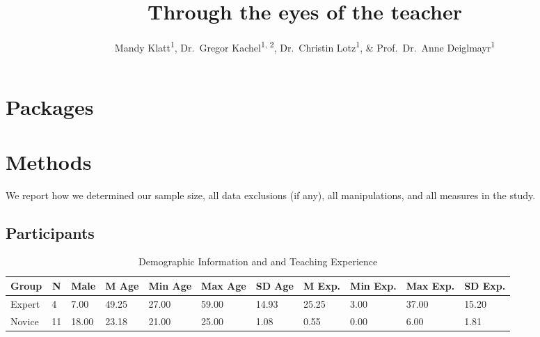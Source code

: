 \documentclass[
  english,
  man,floatsintext]{apa6}
\title{Through the eyes of the teacher}
\author{Mandy Klatt\textsuperscript{1}, Dr.~Gregor Kachel\textsuperscript{1, 2}, Dr.~Christin Lotz\textsuperscript{1}, \& Prof.~Dr.~Anne Deiglmayr\textsuperscript{1}}
\date{}
\affiliation{\vspace{0.5cm}\textsuperscript{1} Leipzig University\\\textsuperscript{2} Max-Planck University for Evolutionary Anthropology}
\begin{document}
\maketitle

\hypertarget{packages}{%
\section{Packages}\label{packages}}

\hypertarget{methods}{%
\section{Methods}\label{methods}}

We report how we determined our sample size, all data exclusions (if any), all manipulations, and all measures in the study.

\hypertarget{participants}{%
\subsection{Participants}\label{participants}}

\begin{table}[h]

\begin{center}
\begin{threeparttable}

\caption{\label{tab:demographicstable}Demographic Information and and Teaching Experience}

\small{

\begin{tabular}{lllllllllll}
\toprule
Group & \multicolumn{1}{c}{N} & \multicolumn{1}{c}{Male} & \multicolumn{1}{c}{M Age} & \multicolumn{1}{c}{Min Age} & \multicolumn{1}{c}{Max Age} & \multicolumn{1}{c}{SD Age} & \multicolumn{1}{c}{M Exp.} & \multicolumn{1}{c}{Min Exp.} & \multicolumn{1}{c}{Max Exp.} & \multicolumn{1}{c}{SD Exp.}\\
\midrule
Expert & 4 & 7.00 & 49.25 & 27.00 & 59.00 & 14.93 & 25.25 & 3.00 & 37.00 & 15.20\\
Novice & 11 & 18.00 & 23.18 & 21.00 & 25.00 & 1.08 & 0.55 & 0.00 & 6.00 & 1.81\\
\bottomrule
\end{tabular}

}

\end{threeparttable}
\end{center}

\end{table}
\end{document}
